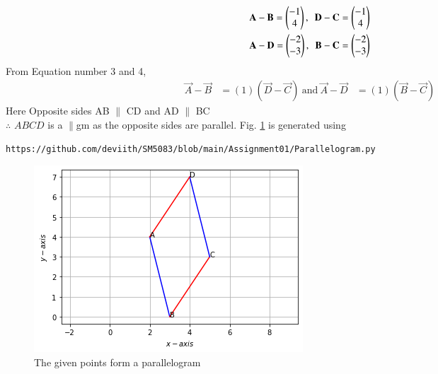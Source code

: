 \documentclass[journal,12pt,twocolumn]{IEEEtran}
\begin{document}
\begin{align}
\label{}
\mathbf{A} - \mathbf{B} = \begin{pmatrix}-1\\4\end{pmatrix},~~
\mathbf{D} - \mathbf{C} = \begin{pmatrix}-1\\4\end{pmatrix}
\\
\mathbf {A} - \mathbf {D} = \begin{pmatrix}-2\\-3\end{pmatrix},~~
\mathbf {B} - \mathbf {C} =\begin{pmatrix}-2\\-3\end{pmatrix}
\label{}
\end{align}
From Equation number 3 and 4,
\begin{align}
    \vec{A} - \vec{B} &= (1) ( \vec{D} - \vec{C} ) ~\text{and}~
    \vec{A} - \vec{D}& = (1) ( \vec{B} - \vec{C} ) 
\end{align}
Here Opposite sides AB $\parallel$ CD and AD $\parallel$ BC \\
$\therefore$ $ABCD$ is a $\parallel$gm as the opposite sides are parallel.
%
\newline Fig. \ref{fig:parallelogram} is generated using 
\begin{lstlisting}
https://github.com/deviith/SM5083/blob/main/Assignment01/Parallelogram.py
\end{lstlisting}
\begin{figure}[!ht]
	\centering
	\includegraphics[width=\columnwidth]{Parallelogram.png}
	\caption{The given points form a parallelogram}
	\label{fig:parallelogram}
\end{figure}
\end{document}
